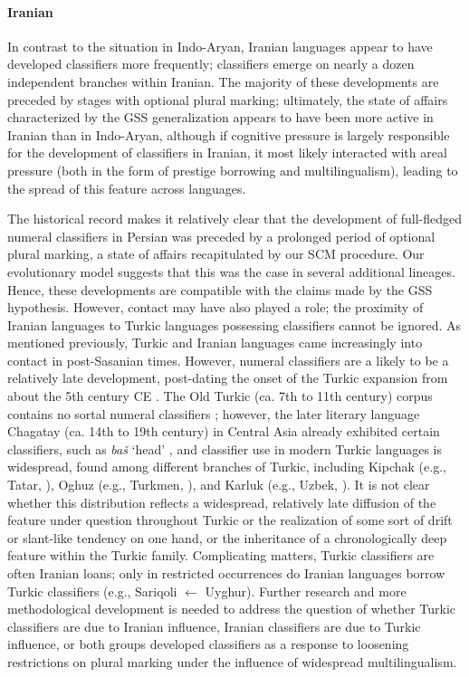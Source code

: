 \documentclass[11pt]{article}
\begin{document}
\paragraph{Iranian}
In contrast to the situation in Indo-Aryan, 
Iranian languages appear to have developed classifiers more frequently; classifiers emerge on nearly a dozen independent branches within Iranian. 
The majority of these developments are preceded by stages with optional plural marking; ultimately, the state of affairs characterized by the GSS generalization appears to have been more active in Iranian than in Indo-Aryan, although if cognitive pressure is largely responsible for the development of classifiers in Iranian, it most likely interacted with areal pressure (both in the form of prestige borrowing and multilingualism), leading to the spread of this feature across languages. 

The historical record makes it relatively clear that the development of full-fledged numeral classifiers in Persian was preceded by a prolonged period of optional plural marking, a state of affairs recapitulated by our SCM procedure. Our evolutionary model suggests that this was the case in several additional lineages. 
Hence, these developments are compatible with the claims made by the GSS hypothesis. However, contact may have also played a role; the proximity of Iranian languages to Turkic languages possessing classifiers cannot be ignored. 
As mentioned previously, Turkic and Iranian languages came increasingly into contact in post-Sasanian times. 
However, numeral classifiers are a likely to be a relatively late development, post-dating the onset of the Turkic expansion from about the 5th century CE \citep{Yunusbayev2015}. The Old Turkic (ca. 7th to 11th century) corpus contains no sortal numeral classifiers \citep[226]{Erdal2004}; however, the later literary language Chagatay (ca. 14th to 19th century) in Central Asia already exhibited certain classifiers, such as {\it ba\v{s}} `head' \citep[155]{Bodrogligeti2001}, and classifier use in modern Turkic languages is widespread, found among different branches of Turkic, including Kipchak (e.g., Tatar, \citealt[70]{ChenZongzhenYiLiqian1986}), Oghuz (e.g., Turkmen, \citealt[169]{Clark1998}), and Karluk (e.g., Uzbek, \citealt{Beckwith1998}). 
It is not clear whether this distribution reflects a widespread, relatively late diffusion of the feature under question throughout Turkic or the realization of some sort of drift or slant-like tendency on one hand, or the inheritance of a chronologically deep feature within the Turkic family. 
Complicating matters, Turkic classifiers are often Iranian loans; only in restricted occurrences do Iranian languages borrow Turkic classifiers (e.g., Sariqoli $\leftarrow$ Uyghur). 
Further research and more methodological development is needed to address the question of whether Turkic classifiers are due to Iranian influence, Iranian classifiers are due to Turkic influence, or both groups developed classifiers as a response to loosening restrictions on plural marking under the influence of widespread multilingualism. 
\end{document}
